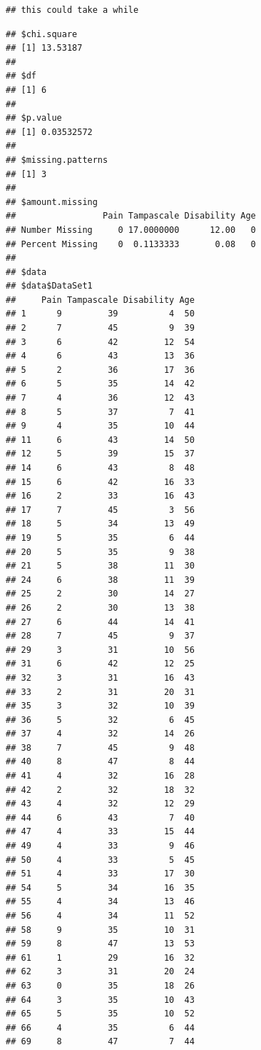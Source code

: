 \documentclass[
]{book}
\begin{document}
\begin{verbatim}
## this could take a while
\end{verbatim}

\begin{verbatim}
## $chi.square
## [1] 13.53187
## 
## $df
## [1] 6
## 
## $p.value
## [1] 0.03532572
## 
## $missing.patterns
## [1] 3
## 
## $amount.missing
##                 Pain Tampascale Disability Age
## Number Missing     0 17.0000000      12.00   0
## Percent Missing    0  0.1133333       0.08   0
## 
## $data
## $data$DataSet1
##     Pain Tampascale Disability Age
## 1      9         39          4  50
## 2      7         45          9  39
## 3      6         42         12  54
## 4      6         43         13  36
## 5      2         36         17  36
## 6      5         35         14  42
## 7      4         36         12  43
## 8      5         37          7  41
## 9      4         35         10  44
## 11     6         43         14  50
## 12     5         39         15  37
## 14     6         43          8  48
## 15     6         42         16  33
## 16     2         33         16  43
## 17     7         45          3  56
## 18     5         34         13  49
## 19     5         35          6  44
## 20     5         35          9  38
## 21     5         38         11  30
## 24     6         38         11  39
## 25     2         30         14  27
## 26     2         30         13  38
## 27     6         44         14  41
## 28     7         45          9  37
## 29     3         31         10  56
## 31     6         42         12  25
## 32     3         31         16  43
## 33     2         31         20  31
## 35     3         32         10  39
## 36     5         32          6  45
## 37     4         32         14  26
## 38     7         45          9  48
## 40     8         47          8  44
## 41     4         32         16  28
## 42     2         32         18  32
## 43     4         32         12  29
## 44     6         43          7  40
## 47     4         33         15  44
## 49     4         33          9  46
## 50     4         33          5  45
## 51     4         33         17  30
## 54     5         34         16  35
## 55     4         34         13  46
## 56     4         34         11  52
## 58     9         35         10  31
## 59     8         47         13  53
## 61     1         29         16  32
## 62     3         31         20  24
## 63     0         35         18  26
## 64     3         35         10  43
## 65     5         35         10  52
## 66     4         35          6  44
## 69     8         47          7  44

\end{verbatim}
\end{document}
